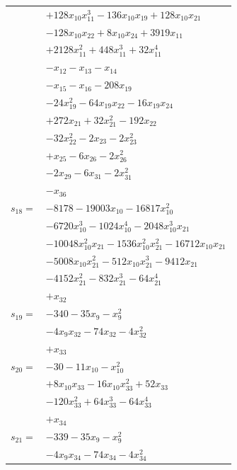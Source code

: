 \begin{longtable}{@{}r@{\;}l@{}}
 & \(\displaystyle +128x_{10}x_{11}^{3} -136x_{10}x_{19} +128x_{10}x_{21}\) \\
 & \(\displaystyle -128x_{10}x_{22} +8x_{10}x_{24} +3919x_{11}\) \\
 & \(\displaystyle +2128x_{11}^{2} +448x_{11}^{3} +32x_{11}^{4}\) \\
 & \(\displaystyle -x_{12} -x_{13} -x_{14}\) \\
 & \(\displaystyle -x_{15} -x_{16} -208x_{19}\) \\
 & \(\displaystyle -24x_{19}^{2} -64x_{19}x_{22} -16x_{19}x_{24}\) \\
 & \(\displaystyle +272x_{21} +32x_{21}^{2} -192x_{22}\) \\
 & \(\displaystyle -32x_{22}^{2} -2x_{23} -2x_{23}^{2}\) \\
 & \(\displaystyle +x_{25} -6x_{26} -2x_{26}^{2}\) \\
 & \(\displaystyle -2x_{29} -6x_{31} -2x_{31}^{2}\) \\
 & \(\displaystyle -x_{36}\) \\[3pt]
\(s_{18}=\) & \(\displaystyle -8178 -19003x_{10} -16817x_{10}^{2}\) \\
 & \(\displaystyle -6720x_{10}^{3} -1024x_{10}^{4} -2048x_{10}^{3}x_{21}\) \\
 & \(\displaystyle -10048x_{10}^{2}x_{21} -1536x_{10}^{2}x_{21}^{2} -16712x_{10}x_{21}\) \\
 & \(\displaystyle -5008x_{10}x_{21}^{2} -512x_{10}x_{21}^{3} -9412x_{21}\) \\
 & \(\displaystyle -4152x_{21}^{2} -832x_{21}^{3} -64x_{21}^{4}\) \\
 & \(\displaystyle +x_{32}\) \\[3pt]
\(s_{19}=\) & \(\displaystyle -340 -35x_{9} -x_{9}^{2}\) \\
 & \(\displaystyle -4x_{9}x_{32} -74x_{32} -4x_{32}^{2}\) \\
 & \(\displaystyle +x_{33}\) \\[3pt]
\(s_{20}=\) & \(\displaystyle -30 -11x_{10} -x_{10}^{2}\) \\
 & \(\displaystyle +8x_{10}x_{33} -16x_{10}x_{33}^{2} +52x_{33}\) \\
 & \(\displaystyle -120x_{33}^{2} +64x_{33}^{3} -64x_{33}^{4}\) \\
 & \(\displaystyle +x_{34}\) \\[3pt]
\(s_{21}=\) & \(\displaystyle -339 -35x_{9} -x_{9}^{2}\) \\
 & \(\displaystyle -4x_{9}x_{34} -74x_{34} -4x_{34}^{2}\) \\

\end{longtable}
